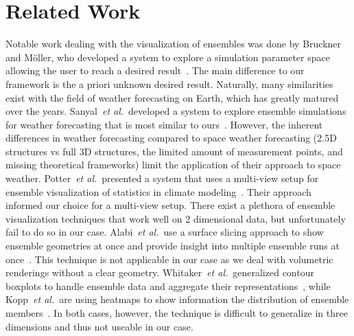 \documentclass[journal]{vgtc}                %
\def\etal{\textit{et al.}}
\def\etal{\textit{et al.}}
\begin{document}
\section{Related Work}
 Notable work dealing with the visualization of ensembles was done by Bruckner and M\"oller, who developed a system to explore a simulation parameter space allowing the user to reach a desired result~\cite{bruckner2010result}. The main difference to our framework is the a priori unknown desired result. Naturally, many similarities exist with the field of weather forecasting on Earth, which has greatly matured over the years. Sanyal~\etal\ developed a system to explore ensemble simulations for weather forecasting that is most similar to ours~\cite{sanyal2010noodles}. However, the inherent differences in weather forecasting compared to space weather forecasting (2.5D structures vs full 3D structures, the limited amount of measurement points, and missing theoretical frameworks) limit the application of their approach to space weather. Potter~\etal\ presented a system that uses a multi-view setup for ensemble visualization of statistics in climate modeling~\cite{potter2009ensemble}. Their approach informed our choice for a multi-view setup. There exist a plethora of ensemble visualization techniques that work well on 2 dimensional data, but unfortunately fail to do so in our case. Alabi~\etal\ use a surface slicing approach to show ensemble geometries at once and provide insight into multiple ensemble runs at once~\cite{alabi2012comparative}. This technique is not applicable in our case as we deal with volumetric renderings without a clear geometry. Whitaker~\etal\ generalized contour boxplots to handle ensemble data and aggregate their representations~\cite{whitaker2013contour}, while Kopp~\etal\ are using heatmaps to show information the distribution of ensemble members~\cite{kopp2014decision}. In both cases, however, the technique is difficult to generalize in three dimensions and thus not useable in our case.
\end{document}

